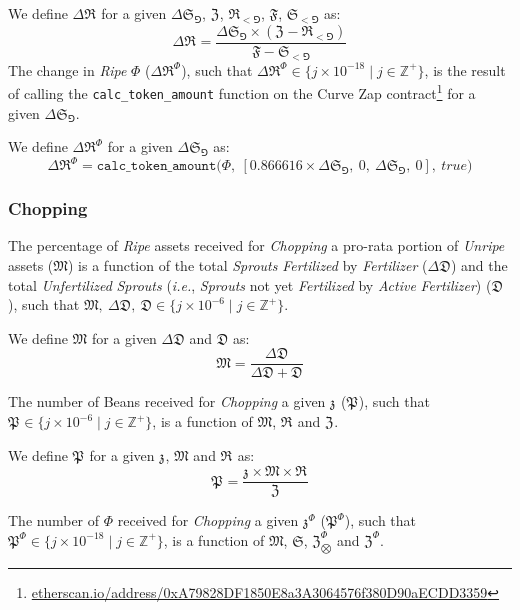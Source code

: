 \documentclass[tikz]{article}
\newcommand{\code}[1]{\texttt{#1}}
\newcommand{\term}[1]{\textsl{#1}}
\newcommand{\fref}[1]{\footnote{\href{http://#1}{#1}}}
\newcommand{\bean}{} %
\begin{document}
We define $\Delta \mathfrak{R}^{\bean}$ for a given $\Delta \mathfrak{S}_{\Game}$, $\mathfrak{Z}^{\bean}$, $\mathfrak{R}_{<\Game}^{\bean}$, $\mathfrak{F}$, $\mathfrak{S}_{<\Game}$ as:
$$\Delta \mathfrak{R}^{\bean} = \frac{\Delta \mathfrak{S}_{\Game} \times (\mathfrak{Z}^{\bean} - \mathfrak{R}_{<\Game}^{\bean})}{\mathfrak{F} - \mathfrak{S}_{<\Game}}$$
The change in \term{Ripe} $\Phi$ ($\Delta \mathfrak{R}^{\Phi}$), such that $\Delta \mathfrak{R}^{\Phi} \in \{j \times 10^{-18} \mid j \in \mathbb{Z}^{+} \}$, is the result of calling the \code{calc\_token\_amount} function on the Curve Zap contract\fref{etherscan.io/address/0xA79828DF1850E8a3A3064576f380D90aECDD3359} for a given $\Delta \mathfrak{S}_{\Game}$.

We define $\Delta \mathfrak{R}^{\Phi}$ for a given $\Delta \mathfrak{S}_{\Game}$ as:
$$\Delta \mathfrak{R}^{\Phi} = \code{calc\_token\_amount(}\Phi,\ [0.866616 \times \Delta \mathfrak{S}_{\Game},\ 0,\ \Delta \mathfrak{S}_{\Game},\ 0],\ true\code{)}$$

\subsubsection{Chopping}
The percentage of \term{Ripe} assets received for \term{Chopping} a pro-rata portion of \term{Unripe} assets ($\mathfrak{M}$) is a function of the total \term{Sprouts} \term{Fertilized} by \term{Fertilizer} ($\Delta \mathfrak{D}$) and the total \term{Unfertilized} \term{Sprouts} (\term{i.e.}, \term{Sprouts} not yet \term{Fertilized} by \term{Active} \term{Fertilizer}) ($\mathfrak{D}$), such that $\mathfrak{M},\ \Delta \mathfrak{D},\ \mathfrak{D} \in \{j \times 10^{-6} \mid j \in \mathbb{Z}^{+} \}$.

We define $\mathfrak{M}$ for a given $\Delta \mathfrak{D}$ and $\mathfrak{D}$ as: 
$$\mathfrak{M} = \frac{\Delta \mathfrak{D}}{\Delta \mathfrak{D} + \mathfrak{D}} $$

The number of Beans received for \term{Chopping} a given $\mathfrak{z}^{\bean}$ ($\mathfrak{P}^{\bean}$), such that $\mathfrak{P}^{\bean} \in \{j \times 10^{-6} \mid j \in \mathbb{Z}^{+} \}$, is a function of $\mathfrak{M}$, $\mathfrak{R}^{\bean}$ and $\mathfrak{Z}^{\bean}$.

We define $\mathfrak{P}^{\bean}$ for a given $\mathfrak{z}^{\bean}$, $\mathfrak{M}$ and $\mathfrak{R}^{\bean}$ as:
$$\mathfrak{P}^{\bean} = \frac{\mathfrak{z}^{\bean} \times \mathfrak{M} \times \mathfrak{R}^{\bean}}{\mathfrak{Z}^{\bean}}$$

The number of $\Phi$ received for \term{Chopping} a given $\mathfrak{z}^{\Phi}$ ($\mathfrak{P}^{\Phi}$), such that $\mathfrak{P}^{\Phi} \in \{j \times 10^{-18} \mid j \in \mathbb{Z}^{+} \}$, is a function of $\mathfrak{M}$, $\mathfrak{S}$, $\mathfrak{Z}_{\bigotimes}^{\Phi}$ and $\mathfrak{Z}^{\Phi}$.
\end{document}
